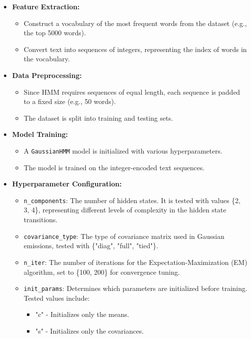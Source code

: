 \begin{itemize}
    \item \textbf{Feature Extraction:} 
        \begin{itemize}
            \item Construct a vocabulary of the most frequent words from the dataset (e.g., the top 5000 words).
            \item Convert text into sequences of integers, representing the index of words in the vocabulary.
        \end{itemize}
    \item \textbf{Data Preprocessing:}
        \begin{itemize}
            \item Since HMM requires sequences of equal length, each sequence is padded to a fixed size (e.g., 50 words).
            \item The dataset is split into training and testing sets.
        \end{itemize}
    \item \textbf{Model Training:}
        \begin{itemize}
            \item A \texttt{GaussianHMM} model is initialized with various hyperparameters.
            \item The model is trained on the integer-encoded text sequences.
        \end{itemize}
    \item \textbf{Hyperparameter Configuration:}
        \begin{itemize}
            \item \texttt{n\_components}: The number of hidden states. It is tested with values \{2, 3, 4\}, representing different levels of complexity in the hidden state transitions.
            \item \texttt{covariance\_type}: The type of covariance matrix used in Gaussian emissions, tested with \{"diag", "full", "tied"\}.
            \item \texttt{n\_iter}: The number of iterations for the Expectation-Maximization (EM) algorithm, set to \{100, 200\} for convergence tuning.
            \item \texttt{init\_params}: Determines which parameters are initialized before training. Tested values include:
                \begin{itemize}
                    \item "c" - Initializes only the means.
                    \item "s" - Initializes only the covariances.

\end{itemize}
\end{itemize}
\end{itemize}
